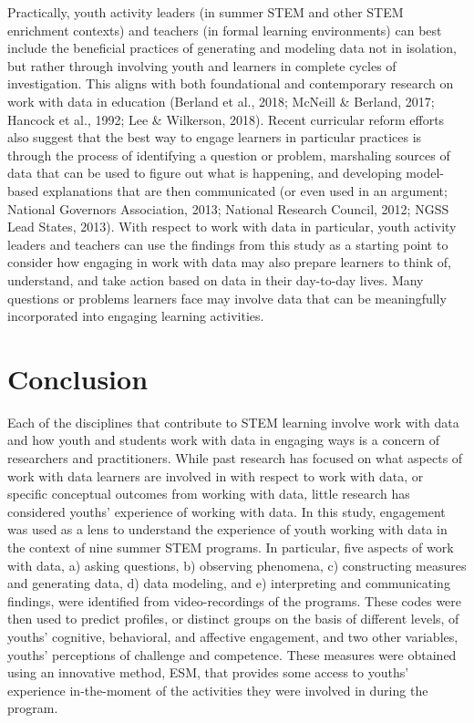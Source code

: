 \documentclass[]{book}
\theoremstyle{definition}
\theoremstyle{definition}
\theoremstyle{definition}
\theoremstyle{remark}
\begin{document}
Practically, youth activity leaders (in summer STEM and other STEM
enrichment contexts) and teachers (in formal learning environments) can
best include the beneficial practices of generating and modeling data
not in isolation, but rather through involving youth and learners in
complete cycles of investigation. This aligns with both foundational and
contemporary research on work with data in education (Berland et al.,
2018; McNeill \& Berland, 2017; Hancock et al., 1992; Lee \& Wilkerson,
2018). Recent curricular reform efforts also suggest that the best way
to engage learners in particular practices is through the process of
identifying a question or problem, marshaling sources of data that can
be used to figure out what is happening, and developing model-based
explanations that are then communicated (or even used in an argument;
National Governors Association, 2013; National Research Council, 2012;
NGSS Lead States, 2013). With respect to work with data in particular,
youth activity leaders and teachers can use the findings from this study
as a starting point to consider how engaging in work with data may also
prepare learners to think of, understand, and take action based on data
in their day-to-day lives. Many questions or problems learners face may
involve data that can be meaningfully incorporated into engaging
learning activities.

\section{Conclusion}\label{conclusion}

Each of the disciplines that contribute to STEM learning involve work
with data and how youth and students work with data in engaging ways is
a concern of researchers and practitioners. While past research has
focused on what aspects of work with data learners are involved in with
respect to work with data, or specific conceptual outcomes from working
with data, little research has considered youths' experience of working
with data. In this study, engagement was used as a lens to understand
the experience of youth working with data in the context of nine summer
STEM programs. In particular, five aspects of work with data, a) asking
questions, b) observing phenomena, c) constructing measures and
generating data, d) data modeling, and e) interpreting and communicating
findings, were identified from video-recordings of the programs. These
codes were then used to predict profiles, or distinct groups on the
basis of different levels, of youths' cognitive, behavioral, and
affective engagement, and two other variables, youths' perceptions of
challenge and competence. These measures were obtained using an
innovative method, ESM, that provides some access to youths' experience
in-the-moment of the activities they were involved in during the
program.
\end{document}
